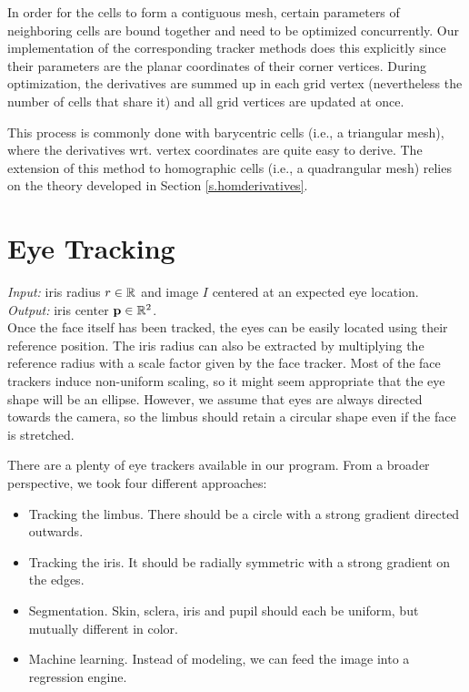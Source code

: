 In order for the cells to form a contiguous mesh, certain parameters of neighboring cells are bound together and need to be optimized concurrently.
Our implementation of the corresponding tracker methods does this explicitly since their parameters are the planar coordinates of their corner vertices.
During optimization, the derivatives are summed up in each grid vertex (nevertheless the number of cells that share it) and all grid vertices are updated at once.

This process is commonly done with barycentric cells (i.e., a triangular mesh), where the derivatives wrt. vertex coordinates are quite easy to derive.
The extension of this method to homographic cells (i.e., a quadrangular mesh) relies on the theory developed in Section \ref{s.homderivatives}.

\section{Eye Tracking}

\textit{Input:} iris radius $r \in \mathbb{R}$ and image $I$ centered at an expected eye location.\\
\textit{Output:} iris center $\mathbf{p} \in \mathbb{R}^2$.\\

Once the face itself has been tracked, the eyes can be easily located using their reference position.
The iris radius can also be extracted by multiplying the reference radius with a scale factor given by the face tracker.
Most of the face trackers induce non-uniform scaling, so it might seem appropriate that the eye shape will be an ellipse.
However, we assume that eyes are always directed towards the camera, so the limbus should retain a circular shape even if the face is stretched.

There are a plenty of eye trackers available in our program.
From a broader perspective, we took four different approaches:
\begin{itemize}
\item Tracking the limbus. There should be a circle with a strong gradient directed outwards.
\item Tracking the iris. It should be radially symmetric with a strong gradient on the edges.
\item Segmentation. Skin, sclera, iris and pupil should each be uniform, but mutually different in color.
\item Machine learning. Instead of modeling, we can feed the image into a regression engine.
\end{itemize}

